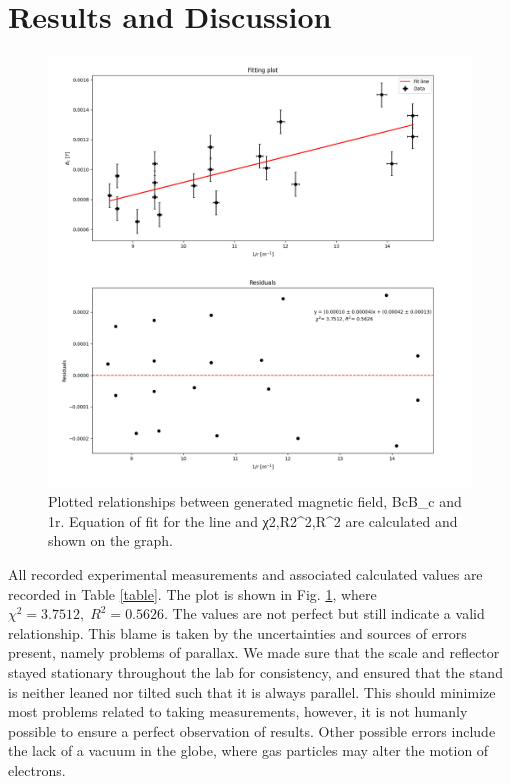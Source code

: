 \documentclass[12pt]{article}
\begin{document}
\section*{Results and Discussion}
\begin{figure}[t!]
\centering
\includegraphics[width=0.8\columnwidth]{figure/Figure_1.png}
\caption{Plotted relationships between generated magnetic field, BcB_c and 1r. Equation of fit for the line and χ2,R2\chi^2,\;R^2 are calculated and shown on the graph.}
\label{fig:subplot}
\end{figure}
All recorded experimental measurements and associated calculated values are recorded in Table \ref{table}. The plot is shown in Fig. \ref{fig:subplot}, where $\chi^2=3.7512,\;R^2=0.5626$. The values are not perfect but still indicate a valid relationship. This blame is taken by the uncertainties and sources of errors present, namely problems of parallax. We made sure that the scale and reflector stayed stationary throughout the lab for consistency, and ensured that the stand is neither leaned nor tilted such that it is always parallel. This should minimize most problems related to taking measurements, however, it is not humanly possible to ensure a perfect observation of results. Other possible errors include the lack of a vacuum in the globe, where gas particles may alter the motion of electrons.
\end{document}
